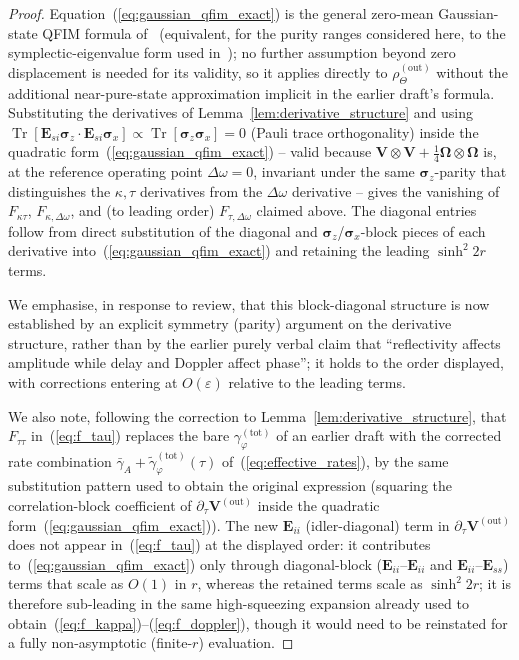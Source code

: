 \documentclass[journal]{IEEEtran}
\DeclareMathOperator{\Tr}{Tr}
\begin{document}
\begin{proof}
Equation~(\ref{eq:gaussian_qfim_exact}) is the general zero-mean Gaussian-state QFIM formula of~\cite{safranek2019estimation} (equivalent, for the purity ranges considered here, to the symplectic-eigenvalue form used in~\cite{monras2013phase}); no further assumption beyond zero displacement is needed for its validity, so it applies directly to $\rho_\Theta^{(\text{out})}$ without the additional near-pure-state approximation implicit in the earlier draft's formula. Substituting the derivatives of Lemma~\ref{lem:derivative_structure} and using $\Tr[\mathbf E_{si}\boldsymbol\sigma_z \cdot \mathbf E_{si}\boldsymbol\sigma_x]\propto\Tr[\boldsymbol\sigma_z\boldsymbol\sigma_x]=0$ (Pauli trace orthogonality) inside the quadratic form~(\ref{eq:gaussian_qfim_exact}) -- valid because $\mathbf V\otimes\mathbf V+\tfrac14\boldsymbol\Omega\otimes\boldsymbol\Omega$ is, at the reference operating point $\Delta\omega=0$, invariant under the same $\boldsymbol\sigma_z$-parity that distinguishes the $\kappa,\tau$ derivatives from the $\Delta\omega$ derivative -- gives the vanishing of $F_{\kappa\tau}$, $F_{\kappa,\Delta\omega}$, and (to leading order) $F_{\tau,\Delta\omega}$ claimed above. The diagonal entries follow from direct substitution of the diagonal and $\boldsymbol\sigma_z$/$\boldsymbol\sigma_x$-block pieces of each derivative into~(\ref{eq:gaussian_qfim_exact}) and retaining the leading $\sinh^2 2r$ terms.

We emphasise, in response to review, that this block-diagonal structure is now established by an explicit symmetry (parity) argument on the derivative structure, rather than by the earlier purely verbal claim that ``reflectivity affects amplitude while delay and Doppler affect phase''; it holds to the order displayed, with corrections entering at $O(\varepsilon)$ relative to the leading terms.

We also note, following the correction to Lemma~\ref{lem:derivative_structure}, that $F_{\tau\tau}$ in~(\ref{eq:f_tau}) replaces the bare $\gamma_\varphi^{(\text{tot})}$ of an earlier draft with the corrected rate combination $\bar\gamma_A+\tilde\gamma_\varphi^{(\text{tot})}(\tau)$ of~(\ref{eq:effective_rates}), by the same substitution pattern used to obtain the original expression (squaring the correlation-block coefficient of $\partial_\tau\mathbf V^{(\text{out})}$ inside the quadratic form~(\ref{eq:gaussian_qfim_exact})). The new $\mathbf E_{ii}$ (idler-diagonal) term in $\partial_\tau\mathbf V^{(\text{out})}$ does not appear in~(\ref{eq:f_tau}) at the displayed order: it contributes to~(\ref{eq:gaussian_qfim_exact}) only through diagonal-block ($\mathbf E_{ii}$--$\mathbf E_{ii}$ and $\mathbf E_{ii}$--$\mathbf E_{ss}$) terms that scale as $O(1)$ in $r$, whereas the retained terms scale as $\sinh^2 2r$; it is therefore sub-leading in the same high-squeezing expansion already used to obtain~(\ref{eq:f_kappa})--(\ref{eq:f_doppler}), though it would need to be reinstated for a fully non-asymptotic (finite-$r$) evaluation.
\end{proof}
\end{document}
